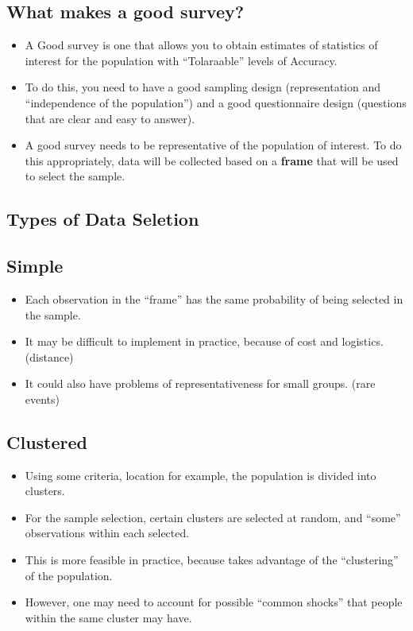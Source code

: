 \documentclass[
  letterpaper,
  DIV=11,
  numbers=noendperiod]{scrartcl}
\providecommand{\tightlist}{%
  \setlength{\itemsep}{0pt}\setlength{\parskip}{0pt}}\usepackage{longtable,booktabs,array}
\begin{document}
\subsection{What makes a good survey?}\label{what-makes-a-good-survey}

\begin{itemize}
\item
  A Good survey is one that allows you to obtain estimates of statistics
  of interest for the population with ``Tolaraable'' levels of Accuracy.
\item
  To do this, you need to have a good sampling design (representation
  and ``independence of the population'') and a good questionnaire
  design (questions that are clear and easy to answer).
\item
  A good survey needs to be representative of the population of
  interest. To do this appropriately, data will be collected based on a
  \textbf{frame} that will be used to select the sample.
\end{itemize}

\subsection{Types of Data Seletion}\label{types-of-data-seletion}

\subsection{Simple}

\begin{itemize}
\item
  Each observation in the ``frame'' has the same probability of being
  selected in the sample.
\item
  It may be difficult to implement in practice, because of cost and
  logistics. (distance)
\item
  It could also have problems of representativeness for small groups.
  (rare events)
\end{itemize}

\subsection{Clustered}

\begin{itemize}
\tightlist
\item
  Using some criteria, location for example, the population is divided
  into clusters.
\item
  For the sample selection, certain clusters are selected at random, and
  ``some'' observations within each selected.
\item
  This is more feasible in practice, because takes advantage of the
  ``clustering'' of the population.
\item
  However, one may need to account for possible ``common shocks'' that
  people within the same cluster may have.
\end{itemize}
\end{document}
